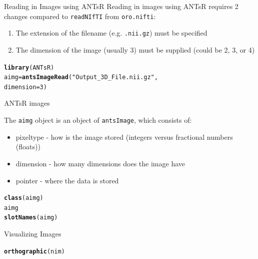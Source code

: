 \documentclass[11pt]{beamer}\usepackage[]{graphicx}\usepackage[]{color}
\makeatletter
\newcommand{\hlnum}[1]{\textcolor[rgb]{0.686,0.059,0.569}{#1}}%
\newcommand{\hlstr}[1]{\textcolor[rgb]{0.192,0.494,0.8}{#1}}%
\newcommand{\hlstd}[1]{\textcolor[rgb]{0.345,0.345,0.345}{#1}}%
\newcommand{\hlkwb}[1]{\textcolor[rgb]{0.69,0.353,0.396}{#1}}%
\newcommand{\hlkwc}[1]{\textcolor[rgb]{0.333,0.667,0.333}{#1}}%
\newcommand{\hlkwd}[1]{\textcolor[rgb]{0.737,0.353,0.396}{\textbf{#1}}}%
\newenvironment{kframe}{%
 \def\at@end@of@kframe{}%
 \ifinner\ifhmode%
  \def\at@end@of@kframe{\end{minipage}}%
  \begin{minipage}{\columnwidth}%
 \fi\fi%
 \def\FrameCommand##1{\hskip\@totalleftmargin \hskip-\fboxsep
 \colorbox{shadecolor}{##1}\hskip-\fboxsep
     \hskip-\linewidth \hskip-\@totalleftmargin \hskip\columnwidth}%
 \MakeFramed {\advance\hsize-\width
   \@totalleftmargin\z@ \linewidth\hsize
   \@setminipage}}%
 {\par\unskip\endMakeFramed%
 \at@end@of@kframe}
\newenvironment{knitrout}{}{} %
\makeatother
\begin{document}
\begin{frame}[fragile]{Reading in Images using ANTsR}
Reading in images using ANTsR requires 2 changes compared to \verb|readNIfTI| from \verb|oro.nifti|:
\begin{enumerate}
\item The extension of the filename (e.g. \verb|.nii.gz|) must be specified
\item The dimension of the image (usually 3) must be supplied (could be 2, 3, or 4)
\end{enumerate}

\begin{knitrout}
\color{fgcolor}\begin{kframe}
\begin{alltt}
\hlkwd{library}\hlstd{(ANTsR)}
\hlstd{aimg} \hlkwb{=} \hlkwd{antsImageRead}\hlstd{(}\hlstr{"Output_3D_File.nii.gz"}\hlstd{,}
\hlkwc{dimension} \hlstd{=} \hlnum{3}\hlstd{)}
\end{alltt}
\end{kframe}
\end{knitrout}
\end{frame}

\begin{frame}[fragile]{ANTsR images}

The \verb|aimg| object is an object of \verb|antsImage|, which consists of:
\begin{itemize}
\item pixeltype - how is the image stored (integers versus fractional numbers (floats))
\item dimension - how many dimensions does the image have
\item pointer - where the data is stored
\end{itemize}

\begin{knitrout}
\color{fgcolor}\begin{kframe}
\begin{alltt}
\hlkwd{class}\hlstd{(aimg)}
\hlstd{aimg}
\hlkwd{slotNames}\hlstd{(aimg)}
\end{alltt}
\end{kframe}
\end{knitrout}
\end{frame}


\begin{frame}[fragile]{Visualizing Images}

\begin{knitrout}
\color{fgcolor}\begin{kframe}
\begin{alltt}
\hlkwd{orthographic}\hlstd{(nim)}
\end{alltt}
\end{kframe}
\end{knitrout}

\end{frame}
\end{document}
